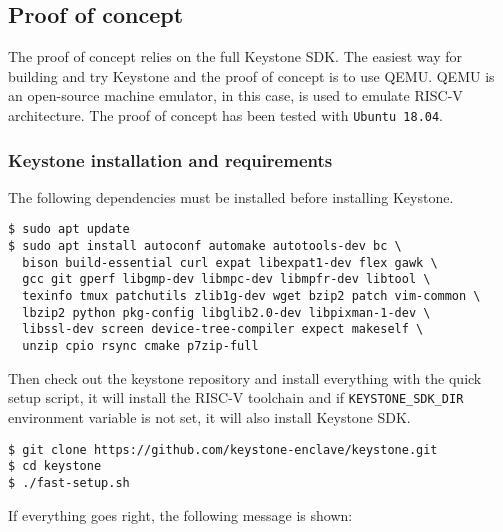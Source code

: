 \subsection{Proof of concept}

The proof of concept relies on the full Keystone SDK. The easiest way for building and try Keystone and the proof of concept is to use QEMU. QEMU is an open-source machine emulator, in this case, is used to emulate RISC-V architecture.
The proof of concept has been tested with \texttt{Ubuntu 18.04}. 
\subsubsection{Keystone installation and requirements}
The following dependencies must be installed before installing Keystone.
\begin{lstlisting}[frame=single]
$ sudo apt update
$ sudo apt install autoconf automake autotools-dev bc \
  bison build-essential curl expat libexpat1-dev flex gawk \ 
  gcc git gperf libgmp-dev libmpc-dev libmpfr-dev libtool \ 
  texinfo tmux patchutils zlib1g-dev wget bzip2 patch vim-common \
  lbzip2 python pkg-config libglib2.0-dev libpixman-1-dev \
  libssl-dev screen device-tree-compiler expect makeself \
  unzip cpio rsync cmake p7zip-full
\end{lstlisting}
Then check out the keystone repository and install everything with the quick setup script, it will install the RISC-V toolchain and if \texttt{KEYSTONE\_SDK\_DIR} environment variable is not set, it will also install Keystone SDK. 

\begin{lstlisting}[frame=single]
$ git clone https://github.com/keystone-enclave/keystone.git
$ cd keystone
$ ./fast-setup.sh
\end{lstlisting}
If everything goes right, the following message is shown: 

